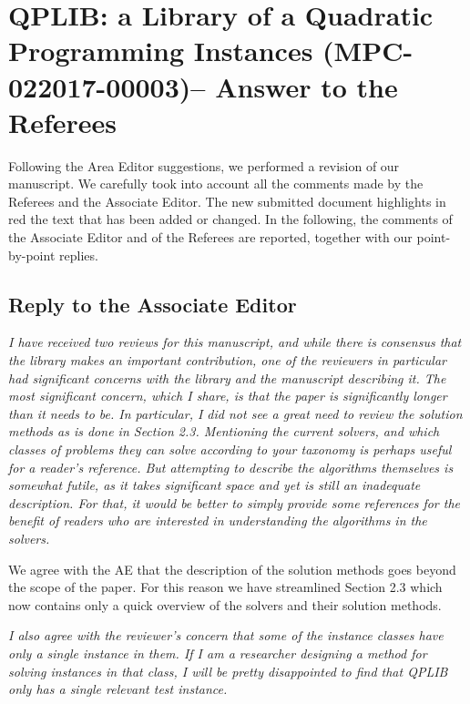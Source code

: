 \documentclass[11pt]{article}
\newcommand{\rep}[1]{{\textcolor{acblue}{#1}}}
\newcommand{\leo}[1]{{\color{red}#1}}
\begin{document}
\section*{QPLIB: a Library of a Quadratic Programming Instances (MPC-022017-00003)-- Answer to the Referees}

\rep{
 Following the Area Editor suggestions, we 
 performed a revision of our manuscript. We carefully took into account all the comments made by the Referees and the Associate Editor.
 The new submitted document highlights in red the text that has been
added or changed.
In the following, the comments of the Associate Editor and of the Referees are reported, together with our point-by-point replies.
}


\subsection*{Reply to the Associate Editor}

{\it
I have received two reviews for this manuscript, and while there is consensus that the library makes an important contribution, one of the reviewers in particular had significant concerns with the library and the manuscript describing it. The most significant concern, which I share, is that the paper is significantly longer than it needs to be. In particular, I did not see a great need to review the solution methods as is done in Section 2.3. Mentioning the current solvers, and which classes of problems they can solve according to your taxonomy is perhaps useful for a reader's reference. But attempting to describe the algorithms themselves is somewhat futile, as it takes significant space and yet is still an inadequate description. For that, it would be better to simply provide some references for the benefit of readers who are interested in understanding the algorithms in the solvers. 
}

\rep{We agree with the AE that the description of the solution methods goes beyond the scope of the paper. For this reason we have streamlined Section 2.3 which now contains only a quick overview of the solvers and their solution methods. 
}

{\it
I also agree with the reviewer's concern that some of the instance classes have only a single instance in them. If I am a researcher designing a method for solving instances in that class, I will be pretty disappointed to find that QPLIB only has a single relevant test instance. 
}
\end{document}
